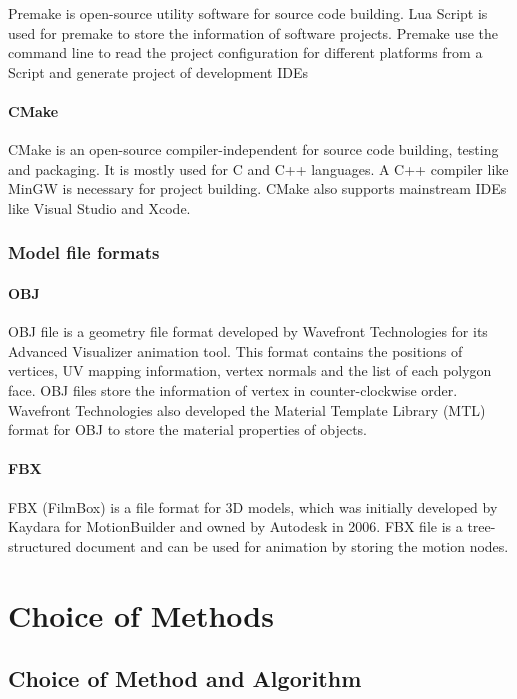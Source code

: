 Premake \cite{premake} is open-source utility software for source code building. Lua \cite{lua} Script is used for premake to store the information of software projects. Premake use the command line to read the project configuration for different platforms from a Script and generate project of development IDEs 

\paragraph{CMake}

CMake \cite{cmake} is an open-source compiler-independent for source code building, testing and packaging. It is mostly used for C and C++ languages. A C++ compiler like MinGW is necessary for project building. CMake also supports mainstream IDEs like Visual Studio and Xcode.

\subsubsection{Model file formats}

\paragraph{OBJ}

OBJ \cite{OBJ} file is a geometry file format developed by Wavefront Technologies for its Advanced Visualizer animation tool. This format contains the positions of vertices, UV mapping information, vertex normals and the list of each polygon face. OBJ files store the information of vertex in counter-clockwise order. Wavefront Technologies also developed the Material Template Library (MTL) format for OBJ to store the material properties of objects.

\paragraph{FBX}

FBX (FilmBox) \cite{FBX} is a file format for 3D models, which was initially developed by Kaydara for MotionBuilder and owned by Autodesk in 2006. FBX file is a tree-structured document and can be used for animation by storing the motion nodes.


\section{Choice of Methods}

\subsection{Choice of Method and Algorithm}
\label{br:cAlgo}

